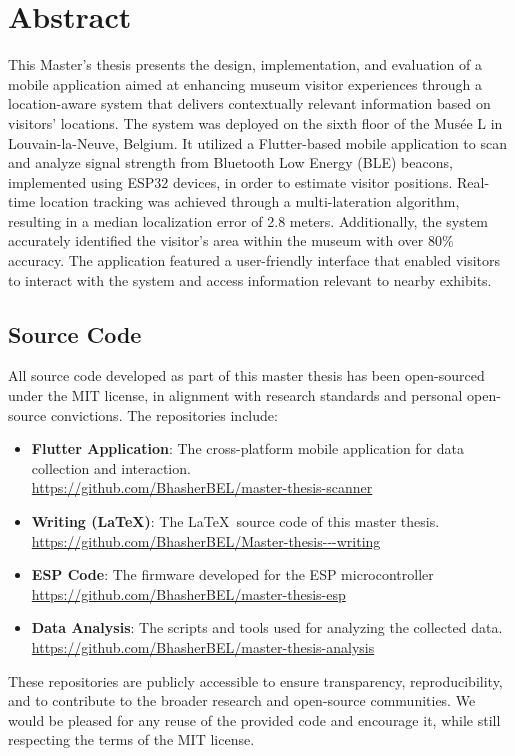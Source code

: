 \chapter*{Abstract}

This Master's thesis presents the design, implementation, and evaluation of a mobile application aimed at enhancing museum visitor experiences through a location-aware system that delivers contextually relevant information based on visitors' locations. The system was deployed on the sixth floor of the Musée L in Louvain-la-Neuve, Belgium. It utilized a Flutter-based mobile application to scan and analyze signal strength from Bluetooth Low Energy (BLE) beacons, implemented using ESP32 devices, in order to estimate visitor positions. Real-time location tracking was achieved through a multi-lateration algorithm, resulting in a median localization error of 2.8 meters. Additionally, the system accurately identified the visitor's area within the museum with over 80\% accuracy. The application featured a user-friendly interface that enabled visitors to interact with the system and access information relevant to nearby exhibits.
\section*{Source Code}

All source code developed as part of this master thesis has been open-sourced under the MIT license, in alignment with research standards and personal open-source convictions. The repositories include:

\begin{itemize}
    \item \textbf{Flutter Application}: The cross-platform mobile application for data collection and interaction. \\
    \url{https://github.com/BhasherBEL/master-thesis-scanner}

    \item \textbf{Writing (LaTeX)}: The \LaTeX\ source code of this master thesis. \\
    \url{https://github.com/BhasherBEL/Master-thesis---writing}

    \item \textbf{ESP Code}: The firmware developed for the ESP microcontroller \\
    \url{https://github.com/BhasherBEL/master-thesis-esp}

    \item \textbf{Data Analysis}: The scripts and tools used for analyzing the collected data. \\
    \url{https://github.com/BhasherBEL/master-thesis-analysis}
\end{itemize}

These repositories are publicly accessible to ensure transparency, reproducibility, and to contribute to the broader research and open-source communities. We would be pleased for any reuse of the provided code and encourage it, while still respecting the terms of the MIT license.
